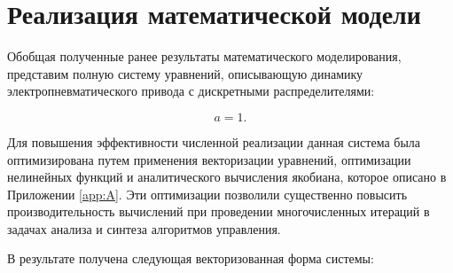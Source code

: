 
\section{Реализация математической модели}\label{sec:ch2/sec5}

Обобщая полученные ранее результаты математического моделирования,
представим полную систему уравнений, описывающую динамику электропневматического
привода с дискретными распределителями:

\begin{equation}\label{eq:ch2/final_system_raw}
    a=1.
\end{equation}

Для повышения эффективности численной реализации данная система была
оптимизирована путем применения векторизации уравнений, оптимизации нелинейных
функций и аналитического вычисления якобиана, которое описано в Приложении \ref{app:A}.
Эти оптимизации позволили существенно повысить производительность вычислений при проведении многочисленных
итераций в задачах анализа и синтеза алгоритмов управления.

В результате получена следующая векторизованная форма системы:

